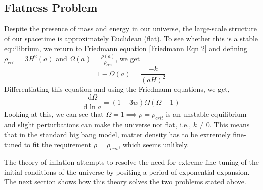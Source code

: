 \documentclass[aps,prd,reprint,preprintnumbers,showpacs,floatfix,nofootinbib,superscript address]{revtex4-2}
\begin{document}
\subsection{Flatness Problem} \label{Flatness Problem}
Despite the presence of mass and energy in our universe, the large-scale structure of our spacetime is approximately Euclidean (flat). To see whether this is a stable equilibrium, we return to Friedmann equation \ref{Friedmann Eqn 2} and defining $\rho_{\text{crit}} = 3H^2(a)$ and $\Omega(a) = \frac{\rho(a)}{\rho_{\text{crit}}}$, we get
\begin{equation}
    1 - \Omega(a) = \frac{-k}{(aH)^2}
\end{equation}
Differentiating this equation and using the Friedmann equations, we get,
\begin{equation}
    \frac{\mathrm{d}\Omega}{\mathrm{d} \ln a} = (1+3w)\Omega(\Omega-1)
\end{equation}
Looking at this, we can see that $\Omega = 1  \implies \rho = \rho_{crit}$ is an unstable equilibrium and slight perturbations can make the universe not flat, i.e., $k \neq 0$. This means that in the standard big bang model, matter density has to be extremely fine-tuned to fit the requirement $\rho = \rho_{crit}$, which seems unlikely.

The theory of inflation attempts to resolve the need for extreme fine-tuning of the initial conditions of the universe by positing a period of exponential expansion. The next section shows how this theory solves the two problems stated above.


\newpage
\,
\newpage
\printbibliography
\end{document}
